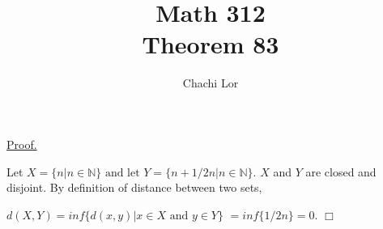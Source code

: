 \documentclass[a4paper]{article}
\title{Math 312\\Theorem 83}
\author{Chachi Lor}
\date{}
\begin{document}
\maketitle
\underline{Proof.}

Let $X = \{ n | n \in \mathbb{N} \} \text{ and let } Y = \{ n+ 1/2n | n \in \mathbb{N} \}$. $X$ and $Y$ are closed and disjoint. 
By definition of distance between two sets,

\begin{center}
$d(X,Y) = inf\{ d(x,y) | x \in X \text{ and } y \in Y \}$
$ = inf \{ 1/2n \} = 0$. $\Box$
\end{center}
 
\end{document}
